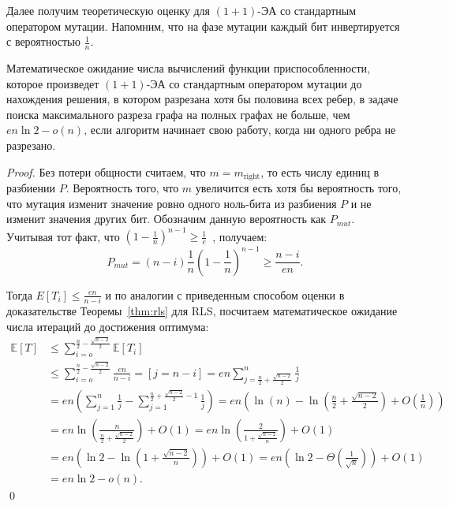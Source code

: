 \documentclass[times]{itmo-student-thesis}
\newcommand{\oea}{\mbox{$(1 + 1)$-ЭА}\xspace}
\begin{document}
Далее получим теоретическую оценку для \oea со стандартным оператором мутации. Напомним, что  на фазе мутации каждый бит инвертируется с вероятностью $\frac{1}{n}$.

\begin{theorem} \label{thm:one}
  Математическое ожидание числа вычислений функции приспособленности, которое произведет \oea со стандартным оператором мутации до нахождения решения, в котором разрезана хотя бы половина всех ребер, в задаче поиска максимального разреза графа на полных графах не больше, чем $en\ln 2 - o(n)$, если алгоритм начинает свою работу, когда ни одного ребра не разрезано.
\end{theorem}

\begin{proof}
  Без потери общности считаем, что $m = m_{\text{right}}$, то есть числу единиц в разбиении $P$. Вероятность того, что $m$ увеличится есть хотя бы вероятность того, что мутация изменит значение ровно одного ноль-бита из разбиения $P$ и не изменит значения других бит. Обозначим данную вероятность как $P_{mut}$.
  Учитывая тот факт, что
  $ (1 - \frac{1}{n})^{n-1} \ge \frac{1}{e}$~\cite{DoerrDE15},
  получаем:
  $$
    P_{mut} = (n-i)\frac{1}{n}\left(1 - \frac{1}{n}\right)^{n-1} \ge \frac{n-i}{en}.
  $$

  Тогда $E[T_i] \leq \frac{en}{n-i}$ и по аналогии с приведенным способом оценки в доказательстве Теоремы~\ref{thm:rls} для RLS, посчитаем математическое ожидание числа итераций до достижения оптимума:
  \begin{align*}
    \mathbb{E}[T] &\le
                \sum_{i=o}^{\frac{n}{2} - \frac{\sqrt{n-2}}{2}} \mathbb{E}[T_i]  \\
        &\leq
                \sum_{i=o}^{\frac{n}{2} - \frac{\sqrt{n-2}}{2}} \frac{en}{n-i} = [j = n - i] = en \sum_{j=\frac{n}{2} + \frac{\sqrt{n-2}}{2}}^{n} \frac{1}{j}  \\
        &=      en \left(\sum_{j=1}^{n}\frac{1}{j} -  \sum_{j=1}^{\frac{n}{2} +  \frac{\sqrt{n-2}}{2} - 1} \frac{1}{j} \right) =
        en\left(\ln(n) - \ln\left(\frac{n}{2} + \frac{\sqrt{n-2}}{2}\right) + O\left(\frac{1}{n}\right) \right) \\
        &=
                en \ln\left(\frac{n}{\frac{n}{2} + \frac{\sqrt{n-2}}{2}}\right) + O(1) = en \ln\left(\frac{2}{1 + \frac{\sqrt{n-2}}{n}}\right) + O(1) \\
        &=      en\left(\ln2 - \ln\left(1 + \frac{\sqrt{n-2}}{n}\right)\right) + O(1) = en\left(\ln2 - \Theta\left(\frac{1}{\sqrt{n}}\right)\right) + O(1) \\
        &=
                 en \ln2 - o(n).
  \end{align*}
  \qed
\end{proof}
\end{document}
